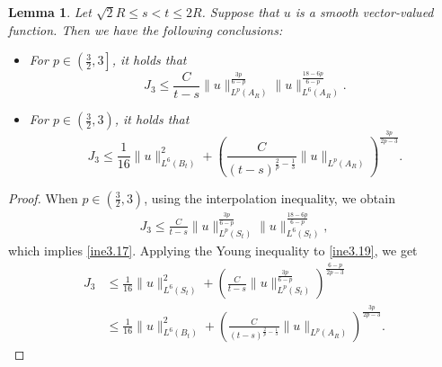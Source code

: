 \documentclass[11pt,reqno]{amsart}
\newtheorem{Lem}{Lemma}[section]
\numberwithin{Thm}{section}
\begin{document}
\begin{Lem}\label{Lem3.4}
Let $\sqrt{2}R\leq s<t\leq 2R$. Suppose that $u$ is a smooth vector-valued function. Then we have the following conclusions:
\begin{itemize}
\item[(i)]  For $p\in\left(\frac{3}{2},3\right]$, it holds that
\begin{equation}\label{ine3.17}
J_3\leq \frac{C}{t-s}\|u\|_{L^p(A_R)}^{\frac{3p}{6-p}}\|u\|_{L^6(A_R)}^{\frac{18-6p}{6-p}}.
\end{equation}
\item[(ii)] For $p\in\left(\frac{3}{2},3\right)$, it holds that
\begin{equation}\label{ine3.18}
J_3\leq\frac{1}{16}\|u\|_{L^6(B_t)}^2+\left(\frac{C}{(t-s)^{\frac{2}{p}-\frac{1}{3}}}\|u\|_{L^p(A_{R})}\right)^\frac{3p}{2p-3}.
\end{equation}
\end{itemize}
\end{Lem}

\begin{proof}
When $p\in\left(\frac{3}{2},3\right)$, using the interpolation inequality, we obtain
\begin{align}\label{ine3.19}
J_3\leq \frac{C}{t-s}\|u\|_{L^p(S_t)}^{\frac{3p}{6-p}}\|u\|_{L^6(S_t)}^{\frac{18-6p}{6-p}},
\end{align}
which implies \eqref{ine3.17}. Applying the Young inequality to \eqref{ine3.19}, we get
\begin{align*}
J_3&\leq \frac{1}{16}\|u\|_{L^6(S_t)}^2+\left(\frac{C}{t-s}\|u\|_{L^p(S_t)}^{\frac{3p}{6-p}}\right)^\frac{6-p}{2p-3}\\
&\leq\frac{1}{16}\|u\|_{L^6(B_t)}^2+\left(\frac{C}{(t-s)^{\frac{2}{p}-\frac{1}{3}}}\|u\|_{L^p(A_R)}\right)^\frac{3p}{2p-3}.
\end{align*}
\end{proof}
\end{document}
